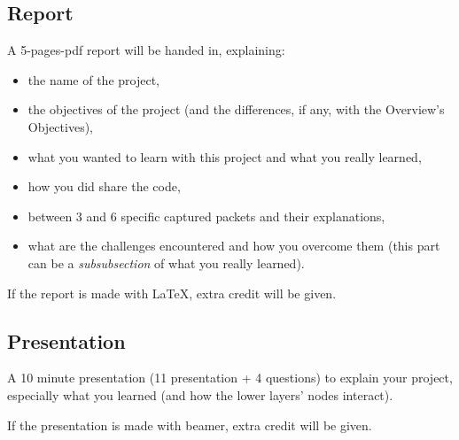 \documentclass[11pt]{article}
\begin{document}
\subsection{Report}
A 5-pages-pdf report will be handed in, explaining:
  \begin{itemize}
    \item the name of the project,
    \item the objectives of the project (and the differences, if any, with the Overview's Objectives),
    \item what you wanted to learn with this project and what you really learned,
    \item how you did share the code,
    \item between 3 and 6 specific captured packets and their explanations,
    \item what are the challenges encountered and how you overcome them (this part can be a \emph{subsubsection} of what you really learned).
  \end{itemize}
If the report is made with \LaTeX, extra credit will be given.

\subsection{Presentation}
A 10 minute presentation (11 presentation + 4 questions) to explain your project, especially what you learned (and how the lower layers' nodes interact).

If the presentation is made with beamer, extra credit will be given.
\end{document}
